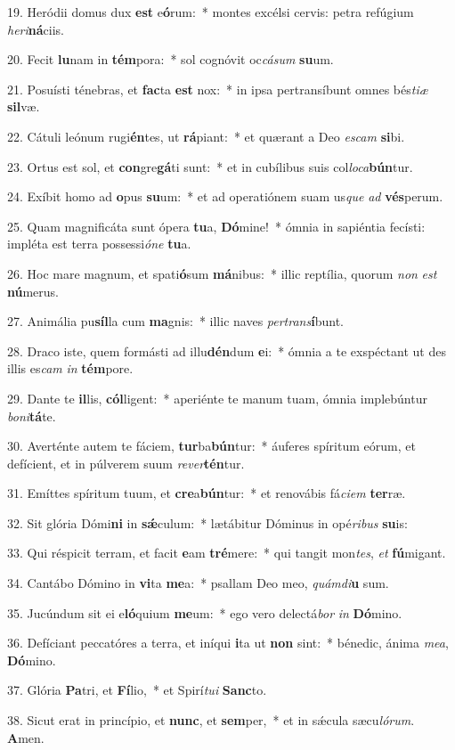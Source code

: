 19. Heródii domus dux \textbf{est} e\textbf{ó}rum:~*  montes excélsi cervis: petra refúgium \textit{he}\textit{ri}\textbf{ná}ciis.\

20. Fecit \textbf{lu}nam in \textbf{tém}pora:~*  sol cognóvit oc\textit{cá}\textit{sum} \textbf{su}um.\

21. Posuísti ténebras, et \textbf{fac}ta \textbf{est} nox:~*  in ipsa pertransíbunt omnes bés\textit{ti}\textit{æ} \textbf{sil}væ.\

22. Cátuli leónum rugi\textbf{én}tes, ut \textbf{rá}piant:~*  et quærant a Deo \textit{es}\textit{cam} \textbf{si}bi.\

23. Ortus est sol, et \textbf{con}gre\textbf{gá}ti sunt:~*  et in cubílibus suis col\textit{lo}\textit{ca}\textbf{bún}tur.\

24. Exíbit homo ad \textbf{o}pus \textbf{su}um:~*  et ad operatiónem suam us\textit{que} \textit{ad} \textbf{vés}perum.\

25. Quam magnificáta sunt ópera \textbf{tu}a, \textbf{Dó}mine!~*  ómnia in sapiéntia fecísti: impléta est terra possessi\textit{ó}\textit{ne} \textbf{tu}a.\

26. Hoc mare magnum, et spati\textbf{ó}sum \textbf{má}nibus:~*  illic reptília, quorum \textit{non} \textit{est} \textbf{nú}merus.\

27. Animália pu\textbf{síl}la cum \textbf{ma}gnis:~*  illic naves \textit{per}\textit{trans}\textbf{í}bunt.\

28. Draco iste, quem formásti ad illu\textbf{dén}dum \textbf{e}i:~*  ómnia a te exspéctant ut des illis es\textit{cam} \textit{in} \textbf{tém}pore.\

29. Dante te \textbf{il}lis, \textbf{cól}ligent:~*  aperiénte te manum tuam, ómnia implebúntur \textit{bo}\textit{ni}\textbf{tá}te.\

30. Averténte autem te fáciem, \textbf{tur}ba\textbf{bún}tur:~*  áuferes spíritum eórum, et defícient, et in púlverem suum \textit{re}\textit{ver}\textbf{tén}tur.\

31. Emíttes spíritum tuum, et \textbf{cre}a\textbf{bún}tur:~*  et renovábis fá\textit{ci}\textit{em} \textbf{ter}ræ.\

32. Sit glória Dómi\textbf{ni} in \textbf{sǽ}culum:~*  lætábitur Dóminus in opé\textit{ri}\textit{bus} \textbf{su}is:\

33. Qui réspicit terram, et facit \textbf{e}am \textbf{tré}mere:~*  qui tangit mon\textit{tes}, \textit{et} \textbf{fú}migant.\

34. Cantábo Dómino in \textbf{vi}ta \textbf{me}a:~*  psallam Deo meo, \textit{quám}\textit{di}\textbf{u} sum.\

35. Jucúndum sit ei e\textbf{ló}quium \textbf{me}um:~*  ego vero delectá\textit{bor} \textit{in} \textbf{Dó}mino.\

36. Defíciant peccatóres a terra, et iníqui \textbf{i}ta ut \textbf{non} sint:~*  bénedic, ánima \textit{me}\textit{a}, \textbf{Dó}mino.\

37. Glória \textbf{Pa}tri, et \textbf{Fí}lio,~*  et Spirí\textit{tu}\textit{i} \textbf{Sanc}to.\

38. Sicut erat in princípio, et \textbf{nunc}, et \textbf{sem}per,~*  et in sǽcula sæcu\textit{ló}\textit{rum}. \textbf{A}men.\

